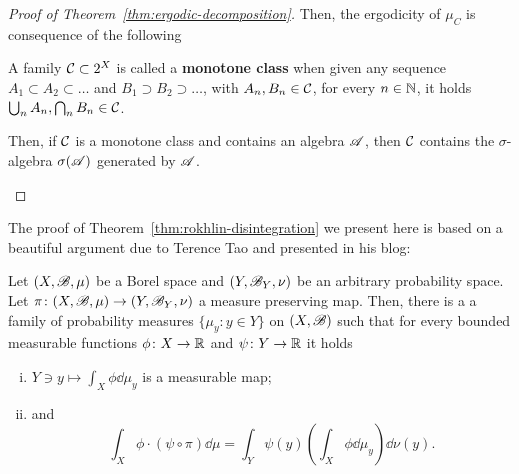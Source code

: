 \begin{proof}[Proof of Theorem~\ref{thm:ergodic-decomposition}]
  Then, the ergodicity of $\mu_{C}$ is consequence of the following
  \begin{exercise}
    A family $\mathcal{C}\subset 2^{X}$ is called a \textbf{monotone class} when given any sequence $A_{1}\subset A_{2}\subset\ldots$ and $B_{1}\supset B_{2}\supset \ldots$, with $A_{n},B_{n}\in\mathcal{C}$, for every $n\in\mathbb{N}$, it holds $\bigcup_{n} A_{n}, \bigcap_{n} B_{n}\in \mathcal{C}$.

    Then, if $\mathcal{C}$ is a monotone class and contains an algebra $\mathscr{A}$, then $\mathcal{C}$ contains the $\sigma$-algebra $\sigma(\mathscr{A})$ generated by $\mathscr{A}$.
  \end{exercise}
\end{proof}

The proof of Theorem~\ref{thm:rokhlin-disintegration} we present here is based on a beautiful argument due to Terence Tao and presented in his blog:

\begin{proposition}
  \label{prop:rhoklin-disintegration-Tao}
  Let $(X,\mathscr{B},\mu)$ be a Borel space and $(Y,\mathscr{B}_Y,\nu)$ be an arbitrary probability space. Let $\pi\colon (X,\mathscr{B},\mu)\to (Y,\mathscr{B}_Y,\nu)$ a measure preserving map. Then, there is a a family of probability measures $\{\mu_y : y\in Y\}$ on $(X,\mathscr{B})$ such that for every bounded measurable functions $\phi\colon X\to\mathbb{R}$ and $\psi\colon Y\to\mathbb{R}$ it holds
  \begin{enumerate}[(i)]
    \item $Y\ni y\mapsto \int_X\phi\dd\mu_y$ is a measurable map;
    \item and
          \begin{displaymath}
            \int_X \phi\cdot (\psi\circ\pi)\dd\mu = \int_Y \psi(y)\left(\int_X\phi\dd\mu_y\right)\dd\nu(y).
          \end{displaymath}
\end{enumerate}
\end{proposition}

